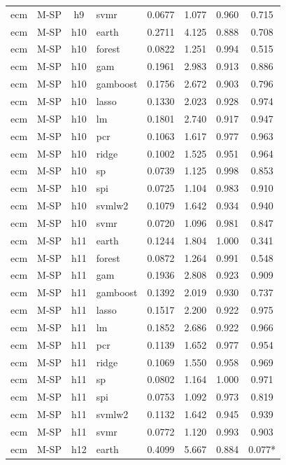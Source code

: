 \begin{ThreePartTable}
\begin{longtable}[t]{llclcccc}
ecm & M-SP & h9 & svmr & 0.0677 & 1.077 & 0.960 & 0.715\\
\addlinespace
ecm & M-SP & h10 & earth & 0.2711 & 4.125 & 0.888 & 0.708\\
ecm & M-SP & h10 & forest & 0.0822 & 1.251 & 0.994 & 0.515\\
ecm & M-SP & h10 & gam & 0.1961 & 2.983 & 0.913 & 0.886\\
ecm & M-SP & h10 & gamboost & 0.1756 & 2.672 & 0.903 & 0.796\\
ecm & M-SP & h10 & lasso & 0.1330 & 2.023 & 0.928 & 0.974\\
ecm & M-SP & h10 & lm & 0.1801 & 2.740 & 0.917 & 0.947\\
ecm & M-SP & h10 & pcr & 0.1063 & 1.617 & 0.977 & 0.963\\
ecm & M-SP & h10 & ridge & 0.1002 & 1.525 & 0.951 & 0.964\\
ecm & M-SP & h10 & sp & 0.0739 & 1.125 & 0.998 & 0.853\\
ecm & M-SP & h10 & spi & 0.0725 & 1.104 & 0.983 & 0.910\\
ecm & M-SP & h10 & svmlw2 & 0.1079 & 1.642 & 0.934 & 0.940\\
ecm & M-SP & h10 & svmr & 0.0720 & 1.096 & 0.981 & 0.847\\
\addlinespace
ecm & M-SP & h11 & earth & 0.1244 & 1.804 & 1.000 & 0.341\\
ecm & M-SP & h11 & forest & 0.0872 & 1.264 & 0.991 & 0.548\\
ecm & M-SP & h11 & gam & 0.1936 & 2.808 & 0.923 & 0.909\\
ecm & M-SP & h11 & gamboost & 0.1392 & 2.019 & 0.930 & 0.737\\
ecm & M-SP & h11 & lasso & 0.1517 & 2.200 & 0.922 & 0.975\\
ecm & M-SP & h11 & lm & 0.1852 & 2.686 & 0.922 & 0.966\\
ecm & M-SP & h11 & pcr & 0.1139 & 1.652 & 0.977 & 0.954\\
ecm & M-SP & h11 & ridge & 0.1069 & 1.550 & 0.958 & 0.969\\
ecm & M-SP & h11 & sp & 0.0802 & 1.164 & 1.000 & 0.971\\
ecm & M-SP & h11 & spi & 0.0753 & 1.092 & 0.973 & 0.819\\
ecm & M-SP & h11 & svmlw2 & 0.1132 & 1.642 & 0.945 & 0.939\\
ecm & M-SP & h11 & svmr & 0.0772 & 1.120 & 0.993 & 0.903\\
\addlinespace
ecm & M-SP & h12 & earth & 0.4099 & 5.667 & 0.884 & 0.077*\\

\end{longtable}
\end{ThreePartTable}
